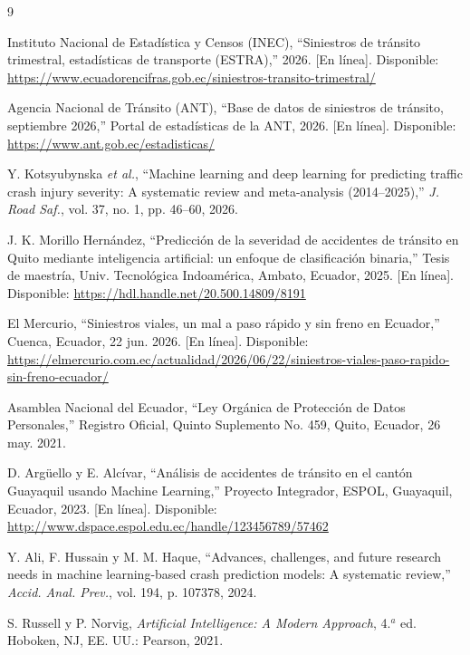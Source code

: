 \begin{thebibliography}{9}

 Instituto Nacional de Estadística y Censos (INEC), ``Siniestros de tránsito trimestral, estadísticas de transporte (ESTRA),'' 2026. [En línea]. Disponible: \url{https://www.ecuadorencifras.gob.ec/siniestros-transito-trimestral/}

 Agencia Nacional de Tránsito (ANT), ``Base de datos de siniestros de tránsito, septiembre 2026,'' Portal de estadísticas de la ANT, 2026. [En línea]. Disponible: \url{https://www.ant.gob.ec/estadisticas/}

 Y. Kotsyubynska \emph{et al.}, ``Machine learning and deep learning for predicting traffic crash injury severity: A systematic review and meta-analysis (2014--2025),'' \emph{J. Road Saf.}, vol. 37, no. 1, pp. 46--60, 2026.

 J. K. Morillo Hernández, ``Predicción de la severidad de accidentes de tránsito en Quito mediante inteligencia artificial: un enfoque de clasificación binaria,'' Tesis de maestría, Univ. Tecnológica Indoamérica, Ambato, Ecuador, 2025. [En línea]. Disponible: \url{https://hdl.handle.net/20.500.14809/8191}

 El Mercurio, ``Siniestros viales, un mal a paso rápido y sin freno en Ecuador,'' Cuenca, Ecuador, 22 jun. 2026. [En línea]. Disponible: \url{https://elmercurio.com.ec/actualidad/2026/06/22/siniestros-viales-paso-rapido-sin-freno-ecuador/}

 Asamblea Nacional del Ecuador, ``Ley Orgánica de Protección de Datos Personales,'' Registro Oficial, Quinto Suplemento No. 459, Quito, Ecuador, 26 may. 2021.

 D. Argüello y E. Alcívar, ``Análisis de accidentes de tránsito en el cantón Guayaquil usando Machine Learning,'' Proyecto Integrador, ESPOL, Guayaquil, Ecuador, 2023. [En línea]. Disponible: \url{http://www.dspace.espol.edu.ec/handle/123456789/57462}

 Y. Ali, F. Hussain y M. M. Haque, ``Advances, challenges, and future research needs in machine learning-based crash prediction models: A systematic review,'' \emph{Accid. Anal. Prev.}, vol. 194, p. 107378, 2024.

 S. Russell y P. Norvig, \emph{Artificial Intelligence: A Modern Approach}, 4.$^a$ ed. Hoboken, NJ, EE. UU.: Pearson, 2021.

\end{thebibliography}
